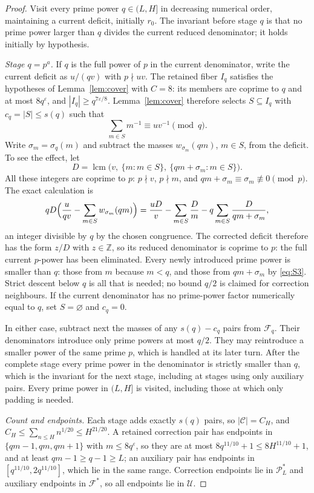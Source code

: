 \documentclass[11pt,letterpaper]{article}
\numberwithin{equation}{section}
\theoremstyle{plain}
\theoremstyle{remark}
\newcommand{\Z}{\mathbb Z}
\newcommand{\cP}{\mathcal P}
\newcommand{\cF}{\mathcal F}
\newcommand{\cU}{\mathcal U}
\newcommand{\cC}{\mathcal C}
\newcommand{\lcm}{\operatorname{lcm}}
\begin{document}
\begin{proof}
Visit every prime power $q\in(L,H]$ in decreasing numerical order, maintaining a current deficit, initially $r_0$. The invariant before stage $q$ is that no prime power larger than $q$ divides the current reduced denominator; it holds initially by hypothesis.

\emph{Stage $q=p^a$.} If $q$ is the full power of $p$ in the current denominator, write the current deficit as $u/(qv)$ with $p\nmid uv$. The retained fiber $I_q$ satisfies the hypotheses of Lemma~\ref{lem:cover} with $C=8$: its members are coprime to $q$ and at most $8q^\varepsilon$, and $|I_q|\ge q^{7\varepsilon/8}$. Lemma~\ref{lem:cover} therefore selects $S\subseteq I_q$ with $c_q=|S|\le s(q)$ such that
\[
\sum_{m\in S}m^{-1}\equiv uv^{-1}\pmod q .
\]
Write $\sigma_m=\sigma_q(m)$ and subtract the masses $w_{\sigma_m}(qm)$, $m\in S$, from the deficit. To see the effect, let
\[
D=\lcm\bigl(v,\ \{m:m\in S\},\ \{qm+\sigma_m:m\in S\}\bigr).
\]
All these integers are coprime to $p$: $p\nmid v$, $p\nmid m$, and $qm+\sigma_m\equiv\sigma_m\not\equiv0\pmod p$. The exact calculation is
\begin{equation}\label{eq:D5}
qD\Bigl(\frac u{qv}-\sum_{m\in S}w_{\sigma_m}(qm)\Bigr)=\frac{uD}v-\sum_{m\in S}\frac Dm-q\sum_{m\in S}\frac D{qm+\sigma_m},
\end{equation}
an integer divisible by $q$ by the chosen congruence. The corrected deficit therefore has the form $z/D$ with $z\in\Z$, so its reduced denominator is coprime to $p$: the full current $p$-power has been eliminated. Every newly introduced prime power is smaller than $q$: those from $m$ because $m<q$, and those from $qm+\sigma_m$ by \eqref{eq:S3}. Strict descent below $q$ is all that is needed; no bound $q/2$ is claimed for correction neighbours. If the current denominator has no prime-power factor numerically equal to $q$, set $S=\varnothing$ and $c_q=0$.

In either case, subtract next the masses of any $s(q)-c_q$ pairs from $\cF_q$. Their denominators introduce only prime powers at most $q/2$. They may reintroduce a smaller power of the same prime $p$, which is handled at its later turn. After the complete stage every prime power in the denominator is strictly smaller than $q$, which is the invariant for the next stage, including at stages using only auxiliary pairs. Every prime power in $(L,H]$ is visited, including those at which only padding is needed.

\emph{Count and endpoints.} Each stage adds exactly $s(q)$ pairs, so $|\cC|=C_H$, and $C_H\le\sum_{n\le H}n^{1/20}\le H^{21/20}$. A retained correction pair has endpoints in $\{qm-1,qm,qm+1\}$ with $m\le8q^\varepsilon$, so they are at most $8q^{11/10}+1\le8H^{11/10}+1$, and at least $qm-1\ge q-1\ge L$; an auxiliary pair has endpoints in $[q^{11/10},2q^{11/10}]$, which lie in the same range. Correction endpoints lie in $\cP^*_L$ and auxiliary endpoints in $\cF^*$, so all endpoints lie in $\cU$.


\end{proof}
\end{document}

